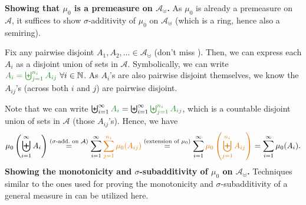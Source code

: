 \begin{enumerate}
\begin{pf}
\textbf{Showing that \(\mu_0\) is a premeasure on
\(\mathcal{A}_{\uplus}\).} As \(\mu_0\) is already a premeasure on
\(\mathcal{A}\), it suffices to show \(\sigma\)-additivity of \(\mu_0\) on
\(\mathcal{A}_{\uplus}\) (which is a ring, hence also a semiring).

Fix any pairwise disjoint \(A_1,A_2,\dotsc\in\mathcal{A}_{\uplus}\)  (don't miss \warn{}).  Then, we
can express each \(A_i\) as a disjoint union of sets in \(\mathcal{A}\).
Symbolically, we can write \(\gc{A_i=\biguplus_{j=1}^{n_i}A_{ij}}~\forall i\in\N\).
As \(A_i\)'s are also pairwise disjoint themselves, we know the \(A_{ij}\)'s
(across both \(i\) and \(j\)) are pairwise disjoint.

Note that we can write \(\biguplus_{i=1}^{\infty}\gc{A_i}
=\biguplus_{i=1}^{\infty}\gc{\biguplus_{j=1}^{n_i}A_{ij}}\), which is a
countable disjoint union of sets in \(\mathcal{A}\) (those \(A_{ij}\)'s).
Hence, we have
\[
\mu_0\left(\biguplus_{i=1}^{\infty}A_i\right)
\overset{\text{(\(\sigma\)-add.~on \(\mathcal{A}\))}}{=}\sum_{i=1}^{\infty}\orc{\sum_{j=1}^{n_i}\mu_0(A_{ij})}
\overset{\text{(extension of \(\mu_0\))}}{=}\sum_{i=1}^{\infty}\orc{\mu_0\left(\biguplus_{j=1}^{n_i}A_{ij}\right)}
=\sum_{i=1}^{\infty}\mu_0(A_i).
\]
\textbf{Showing the monotonicity and \(\sigma\)-subadditivity of \(\mu_0\) on
\(\mathcal{A}_{\uplus}\).} Techniques similar to the ones used for proving the
monotonicity and \(\sigma\)-subadditivity of a general measure in
 can be utilized here.
\end{pf}
\end{enumerate}
